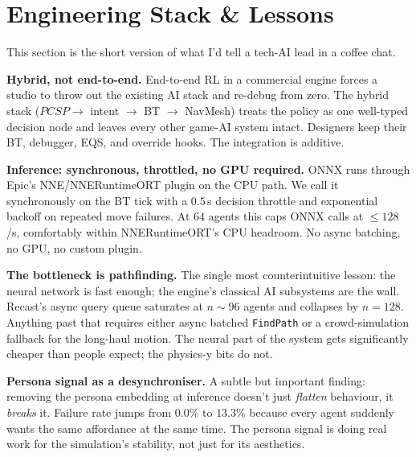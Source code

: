 \documentclass[11pt]{article}
\newcommand{\PCSP}{PCSP}
\begin{document}
\section{Engineering Stack \& Lessons}
\label{sec:eng}

This section is the short version of what I'd tell a tech-AI lead
in a coffee chat.

\noindent\textbf{Hybrid, not end-to-end.}
End-to-end RL in a commercial engine forces a studio to throw out the
existing AI stack and re-debug from zero. The hybrid stack
($\PCSP{} \rightarrow$ intent $\rightarrow$ BT $\rightarrow$ NavMesh)
treats the policy as one well-typed decision node and leaves every
other game-AI system intact. Designers keep their BT, debugger,
EQS, and override hooks. The integration is additive.

\noindent\textbf{Inference: synchronous, throttled, no GPU required.}
ONNX runs through Epic's NNE/NNERuntimeORT plugin on the CPU path.
We call it synchronously on the BT tick with a $0.5$\,s decision
throttle and exponential backoff on repeated move failures. At $64$
agents this caps ONNX calls at $\leq\!128$/s, comfortably within
NNERuntimeORT's CPU headroom. No async batching, no GPU, no
custom plugin.

\noindent\textbf{The bottleneck is pathfinding.}
The single most counterintuitive lesson: the neural network is fast
enough; the engine's classical AI subsystems are the wall. Recast's
async query queue saturates at $n\!\sim\!96$ agents and collapses by
$n\!=\!128$. Anything past that requires either async batched
\texttt{FindPath} or a crowd-simulation fallback for the long-haul
motion. The neural part of the system gets significantly cheaper
than people expect; the physics-y bits do not.

\noindent\textbf{Persona signal as a desynchroniser.}
A subtle but important finding: removing the persona embedding at
inference doesn't just \emph{flatten} behaviour, it \emph{breaks} it.
Failure rate jumps from $0.0\%$ to $13.3\%$ because every agent
suddenly wants the same affordance at the same time. The persona
signal is doing real work for the simulation's stability, not just
for its aesthetics.
\end{document}
